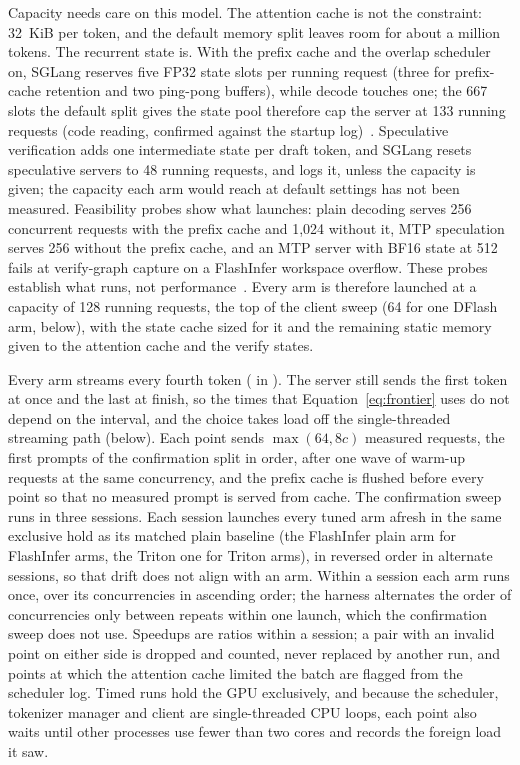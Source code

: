 Capacity needs care on this model. The attention cache is not the constraint: 32~KiB per token, and the default memory split leaves room for about a million tokens. The recurrent state is. With the prefix cache and the overlap scheduler on, SGLang reserves five FP32 state slots per running request (three for prefix-cache retention and two ping-pong buffers), while decode touches one; the 667 slots the default split gives the state pool therefore cap the server at 133 running requests (code reading, confirmed against the startup log)~. Speculative verification adds one intermediate state per draft token, and SGLang resets speculative servers to 48 running requests, and logs it, unless the capacity is given; the capacity each arm would reach at default settings has not been measured. Feasibility probes show what launches: plain decoding serves 256 concurrent requests with the prefix cache and 1,024 without it, MTP speculation serves 256 without the prefix cache, and an MTP server with BF16 state at 512 fails at verify-graph capture on a FlashInfer workspace overflow. These probes establish what runs, not performance~. Every arm is therefore launched at a capacity of 128 running requests, the top of the client sweep (64 for one DFlash arm, below), with the state cache sized for it and the remaining static memory given to the attention cache and the verify states.

Every arm streams every fourth token ( in ). The server still sends the first token at once and the last at finish, so the times that Equation~\eqref{eq:frontier} uses do not depend on the interval, and the choice takes load off the single-threaded streaming path (below). Each point sends $\max(64,8c)$ measured requests, the first prompts of the confirmation split in order, after one wave of warm-up requests at the same concurrency, and the prefix cache is flushed before every point so that no measured prompt is served from cache. The confirmation sweep runs in three sessions. Each session launches every tuned arm afresh in the same exclusive hold as its matched plain baseline (the FlashInfer plain arm for FlashInfer arms, the Triton one for Triton arms), in reversed order in alternate sessions, so that drift does not align with an arm. Within a session each arm runs once, over its concurrencies in ascending order; the harness alternates the order of concurrencies only between repeats within one launch, which the confirmation sweep does not use. Speedups are ratios within a session; a pair with an invalid point on either side is dropped and counted, never replaced by another run, and points at which the attention cache limited the batch are flagged from the scheduler log. Timed runs hold the GPU exclusively, and because the scheduler, tokenizer manager and client are single-threaded CPU loops, each point also waits until other processes use fewer than two cores and records the foreign load it saw.

